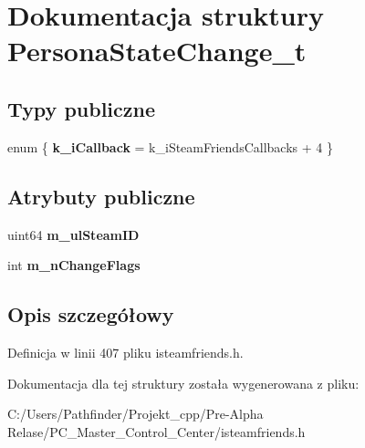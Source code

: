 \hypertarget{struct_persona_state_change__t}{}\section{Dokumentacja struktury Persona\+State\+Change\+\_\+t}
\label{struct_persona_state_change__t}
\subsection*{Typy publiczne}
\begin{DoxyCompactItemize}
\item 
\mbox{\label{struct_persona_state_change__t_ab928394fd280b902c6f076597459acc8}} 
enum \{ {\bfseries k\+\_\+i\+Callback} = k\+\_\+i\+Steam\+Friends\+Callbacks + 4
 \}
\end{DoxyCompactItemize}
\subsection*{Atrybuty publiczne}
\begin{DoxyCompactItemize}
\item 
\mbox{\label{struct_persona_state_change__t_afff92ef97236d8be7ab77288a6f0a0d0}} 
uint64 {\bfseries m\+\_\+ul\+Steam\+ID}
\item 
\mbox{\label{struct_persona_state_change__t_a47a4d98424f704ed04c0545def9b18e2}} 
int {\bfseries m\+\_\+n\+Change\+Flags}
\end{DoxyCompactItemize}


\subsection{Opis szczegółowy}


Definicja w linii 407 pliku isteamfriends.\+h.



Dokumentacja dla tej struktury została wygenerowana z pliku\+:\begin{DoxyCompactItemize}
\item 
C\+:/\+Users/\+Pathfinder/\+Projekt\+\_\+cpp/\+Pre-\/\+Alpha Relase/\+P\+C\+\_\+\+Master\+\_\+\+Control\+\_\+\+Center/isteamfriends.\+h\end{DoxyCompactItemize}
